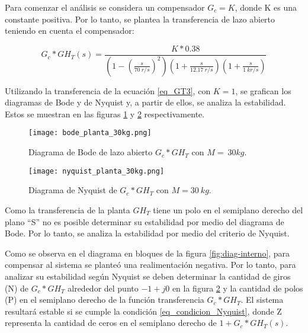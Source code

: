 Para comenzar el análisis se considera un compensador $G_c=K$, donde K es una constante positiva. Por lo tanto, se plantea la transferencia de lazo abierto teniendo en cuenta el compensador:

\begin{equation} \label{eq_GT3}
	G_c*GH_T(s)=\frac{K*0.38}{(1-(\frac{s}{70\:r/s})^2)(1+\frac{s}{12.17\:r/s })(1+\frac{s}{1\:kr/s}) }	
\end{equation}

Utilizando la transferencia de la ecuación \ref{eq_GT3}, con $K=1$, se  grafican los diagramas de Bode y de Nyquist y, a partir de ellos, se analiza la estabilidad. Estos se muestran en las figuras \ref{fig:Diag_Bode_lazo_abierto_30kg} y \ref{fig:Diag_Nyquist_lazo_abierto_30kg} respectivamente.

\begin{figure}[H]
	\centering
	\texttt{[image: bode\_planta\_30kg.png]}
	\caption{Diagrama de Bode de lazo abierto $G_c*GH_T$ con $M=\:30 kg$.}
	\label{fig:Diag_Bode_lazo_abierto_30kg}
\end{figure}

\begin{figure}[H]
	\centering
	\texttt{[image: nyquist\_planta\_30kg.png]}
	\caption{Diagrama de Nyquist de $G_c*GH_T$ con $M=30\:kg$.}
	\label{fig:Diag_Nyquist_lazo_abierto_30kg}
\end{figure}



Como la transferencia de la planta $GH_T$ tiene un polo en el semiplano derecho del plano ``S'' no es posible determinar su estabilidad por medio del diagrama de Bode. Por lo tanto, se analiza la estabilidad por medio del criterio de Nyquist.

Como se observa en el diagrama en bloques de la figura \ref{fig:diag-interno}, para compensar al sistema se planteó una realimentación negativa. Por lo tanto, para analizar su estabilidad según Nyquist se deben determinar la cantidad de giros (N) de $G_c*GH_T$ alrededor del punto $-1+j0$ en la figura \ref{fig:Diag_Nyquist_lazo_abierto_30kg} y la cantidad de polos (P) en el semiplano derecho de la función transferencia $G_c*GH_T$. El sistema resultará estable si se cumple la condición \ref{eq_condicion_Nyquist}, donde Z representa la cantidad de ceros en el semiplano derecho de $1+G_c*GH_T(s)$.

